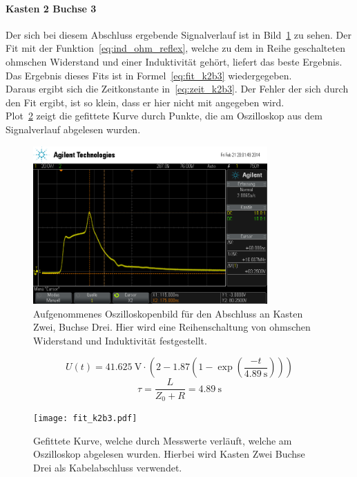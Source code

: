 \paragraph{Kasten 2 Buchse 3}
Der sich bei diesem Abschluss ergebende Signalverlauf ist in 
Bild~\ref{fig:k2b3} zu sehen. Der Fit mit der 
Funktion~\eqref{eq:ind_ohm_reflex}, welche zu dem in Reihe geschalteten 
ohmschen Widerstand und einer Induktivität gehört, liefert das 
beste Ergebnis. Das Ergebnis dieses Fits ist in 
Formel~\eqref{eq:fit_k2b3} wiedergegeben.\\
Daraus ergibt sich die Zeitkonstante in~\eqref{eq:zeit_k2b3}.
Der Fehler der sich durch den Fit ergibt, ist so klein, dass er hier 
nicht mit angegeben wird.\\
Plot~\ref{fig:fit_k2b3} zeigt die gefittete Kurve durch Punkte, die 
am Oszilloskop aus dem Signalverlauf abgelesen wurden.\\
%
\begin{figure}[]
\centering
\includegraphics[width=0.8\textwidth]{k2b3.png}
\caption{Aufgenommenes Oszilloskopenbild für den Abschluss 
an Kasten Zwei, Buchse Drei. Hier wird eine Reihenschaltung von 
ohmschen Widerstand und Induktivität festgestellt.}
\label{fig:k2b3}
\end{figure}
%
\begin{equation}
U(t) = \SI{41.625}{\volt}\cdot\left(2 - 
1.87\left(1-\exp{\left(\frac{-t}{\SI{4.89}{\second}}\right)}
\right)\right)
\label{eq:fit_k2b3}
\end{equation}
%
\begin{equation}
\tau = \frac{L}{Z_0 + R} = \SI{4.89}{\second}
\label{eq:zeit_k2b3}
\end{equation}
%
\begin{figure}[]
\centering
\texttt{[image: fit\_k2b3.pdf]}
\caption{Gefittete Kurve, welche durch Messwerte verläuft, welche 
am Oszilloskop abgelesen wurden. Hierbei wird Kasten Zwei Buchse 
 Drei als Kabelabschluss verwendet.}
\label{fig:fit_k2b3}
\end{figure}
%
\FloatBarrier
%
